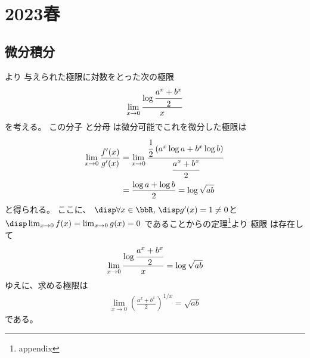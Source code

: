 \section{2023春}

\subsection{微分積分}

\begin{ans*}
  より
  与えられた極限に対数をとった次の極限
  \begin{gather}
    \lim_{x\to 0} \frac{\log \cfrac{a^x + b^x}{2}}{x}
  \end{gather}
  を考える。
  この分子
  と分母
  は微分可能でこれを微分した極限は
  \begin{align}
    \lim_{x\to 0} \frac{f'(x)}{g'(x)}
    &=\lim_{x\to 0} \frac{\cfrac{1}{2}\;(a^x\log a+b^x\log b)}{\cfrac{a^x + b^x}{2}} \\
    &= \frac{\log a + \log b}{2} = \log \sqrt{ab}
  \end{align}
  と得られる。
  ここに、
  $\disp\forall x\in\bbR,\,\disp g'(x) = 1 \neq 0 $と$\disp \lim_{x\to 0}f(x) = \lim_{x\to 0}g(x) = 0$
  であることから\lhopital の定理\footnote{appendix}より
  極限
  は存在して
  \begin{gather}
    \lim_{x\to 0} \frac{\log \cfrac{a^x + b^x}{2}}{x} = \log\sqrt{ab}
  \end{gather}
  ゆえに、求める極限は
  \begin{align}
    \lim_{x\to 0}\left(\frac{a^x+b^x}{2}\right)^{1/x}
     = \sqrt{ab}
  \end{align}
  である。
\end{ans*}


